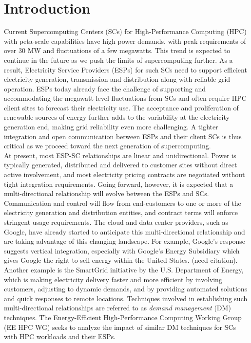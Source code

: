\section{Introduction}

Current Supercomputing Centers (SCs) for High-Performance Computing (HPC) with peta-scale capabilities have high power demands, with peak requirements of over 30 MW and fluctuations of a few megawatts. This trend is expected to continue in the future as we push the limits of supercomputing further. As a result, Electricity Service Providers (ESPs) for such SCs need to support efficient electricity generation, transmission and distribution along with reliable grid operation. ESPs today already face the challenge of supporting and accommodating  the megawatt-level fluctuations from SCs and often require HPC client sites to forecast their electricity use. The acceptance and proliferation of renewable sources of energy further adds to the variability at the electricity generation end, making grid reliability even more challenging. A tighter integration and open communication between ESPs and their client SCs is thus critical as we proceed toward the next generation of supercomputing. \\

At present, most ESP-SC relationships are linear and unidirectional. Power is typically generated, distributed and delivered to customer sites without direct active involvement, and most electricity pricing contracts are negotiated without tight integration requirements. Going forward, however, it is expected that a multi-directional relationship will evolve between the ESPs and SCs.  Communication and control will flow from end-customers to one or more of the electricity generation and distribution entities, and contract terms will enforce stringent usage requirements. The cloud and data center providers, such as Google, have already started to anticipate this multi-directional relationship and are taking advantage of this changing landscape.  For example, Google's response suggests vertical integration, especially with Google's Energy Subsidiary which gives Google the right to sell energy within the United States. (need citation). Another example is the SmartGrid initiative \cite{SmartGrid} by the U.S. Department of Energy, which is making electricity delivery faster and more efficient by involving customers, adjusting to dynamic demands, and by providing automated solutions and quick responses to remote locations. Techniques involved in establishing such multi-directional relationships are referred to as \emph{demand management} (DM) techniques. The Energy-Efficient High-Performance Computing Working Group (EE HPC WG) seeks to analyze the impact of similar DM techniques for SCs with HPC workloads and their ESPs. \\

